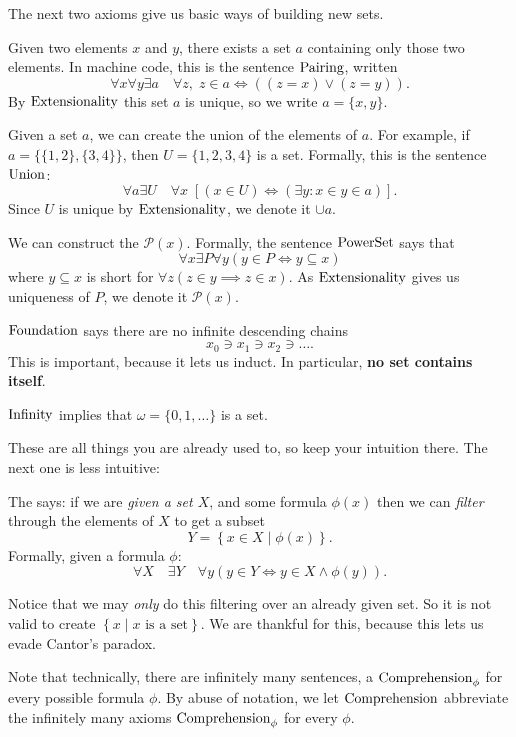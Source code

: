 The next two axioms give us basic ways of building new sets.
\begin{itemize}
	\ii Given two elements $x$ and $y$, there exists a set $a$ containing only those two elements.
	In machine code, this is the sentence $\mathrm{Pairing}$, written
	\[ \forall x \forall y \exists a \quad \forall z,
		\; z \in a \iff \left( (z=x) \lor (z=y) \right). \]
	By $\mathrm{Extensionality}$ this set $a$ is unique, so we write $a = \{x,y\}$.

	\ii Given a set $a$, we can create the union of the elements of $a$.
	For example, if $a = \{ \{1,2\}, \{3,4\} \}$, then $U = \{1,2,3,4\}$ is a set.
	Formally, this is the sentence $\mathrm{Union}$:
	\[ \forall a \exists U \quad \forall x \;
		\left[ (x \in U) \iff (\exists y : x \in y \in a) \right]. \]
	Since $U$ is unique by $\mathrm{Extensionality}$, we denote it $\cup a$.

	\ii 
	We can construct the  $\mathcal P(x)$.
	Formally, the sentence $\mathrm{PowerSet}$ says that
	\[ \forall x \exists P \forall y (y \in P \iff y \subseteq x) \]
	where $y \subseteq x$ is short for $\forall z (z \in y \implies z \in x)$.
	As $\mathrm{Extensionality}$ gives us uniqueness of $P$,
	we denote it $\mathcal P(x)$.

	\ii $\mathrm{Foundation}$ says there are no infinite descending chains
	\[ x_0 \ni x_1 \ni x_2 \ni \dots. \]
	This is important, because it lets us induct.
	In particular, \textbf{no set contains itself}.

	\ii $\mathrm{Infinity}$ implies that $\omega = \{0,1,\dots\}$ is a set.
\end{itemize}
These are all things you are already used to, so keep your intuition there.
The next one is less intuitive:
\begin{itemize}
	\ii The  says:
	if we are \emph{given a set $X$}, and some formula $\phi(x)$
	then we can \emph{filter} through the elements of $X$ to get a subset
	\[ Y = \left\{ x \in X \mid \phi(x) \right\}. \]
	Formally, given a formula $\phi$:
	\[
		\forall X \quad \exists Y \quad
		\forall y (y \in Y \iff y \in X \land \phi(y)).
	\]
\end{itemize}
Notice that we may \emph{only} do this filtering over an already given set.
So it is not valid to create
$ \left\{ x \mid x \text{ is a set} \right\} $.
We are thankful for this, because this lets us evade Cantor's paradox.

\begin{abuse}
	Note that technically, there are infinitely many sentences,
	a $\mathrm{Comprehension}_\phi$ for every possible formula $\phi$.
	By abuse of notation, we let $\mathrm{Comprehension}$ abbreviate
	the infinitely many axioms $\mathrm{Comprehension}_\phi$ for every $\phi$.
\end{abuse}

